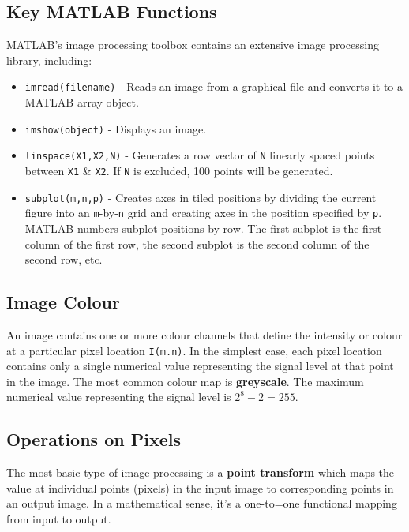 \documentclass[11pt]{article}
\begin{document}
\subsection{Key MATLAB Functions}
MATLAB's image processing toolbox contains an extensive image processing library, including:
\begin{itemize}
    \item   \verb|imread(filename)|     - Reads an image from a graphical file and converts it to a MATLAB array object.
    \item   \verb|imshow(object)|       - Displays an image.
    \item   \verb|linspace(X1,X2,N)|    - Generates a row vector of \verb|N| linearly spaced points between \verb|X1| \& \verb|X2|.
                                          If \verb|N| is excluded, 100 points will be generated. 
    \item   \verb|subplot(m,n,p)|       - Creates axes in tiled positions by dividing the current figure into an \verb|m|-by-\verb|n| 
                                          grid and creating axes in the position specified by \verb|p|.
                                          MATLAB numbers subplot positions by row. 
                                          The first subplot is the first column of the first row, the second subplot is the second column 
                                          of the second row, etc.
\end{itemize}

\subsection{Image Colour}
An image contains one or more colour channels that define the intensity or colour at a particular pixel location \verb|I(m.n)|. 
In the simplest case, each pixel location contains only a single numerical value representing the signal level at that point in the image. 
The most common colour map is \textbf{greyscale}.
The maximum numerical value representing the signal level is $2^8-2=255$.

\subsection{Operations on Pixels}
The most basic type of image processing is a \textbf{point transform} which maps the value at individual points (pixels) in the input 
image to corresponding points in an output image. 
In a mathematical sense, it's a one-to=one functional mapping from input to output.
\end{document}
